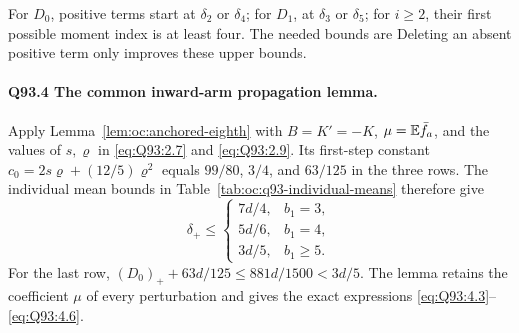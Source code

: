 For \(D_0\), positive terms start at \(\delta_2\) or \(\delta_4\);
for \(D_1\), at \(\delta_3\) or \(\delta_5\); for \(i\ge2\), their
first possible moment index is at least four. The needed bounds are
Deleting an absent positive term only improves these upper bounds.

\paragraph{Q93.4 The common inward-arm propagation lemma.}
Apply Lemma~\ref{lem:oc:anchored-eighth} with $B=K'=-K$,
$\mu=\mathbb E\bar f_a$, and the values of $s,\varrho$ in
\eqref{eq:Q93:2.7} and \eqref{eq:Q93:2.9}. Its first-step constant
$c_0=2s\varrho+(12/5)\varrho^2$ equals $99/80$, $3/4$, and
$63/125$ in the three rows. The individual mean bounds in
Table~\ref{tab:oc:q93-individual-means} therefore give
\begin{equation}\tag{Q93.4.2}\label{eq:Q93:4.2}
 \delta_+\le
 \begin{cases}7d/4,&b_1=3,\\5d/6,&b_1=4,\\3d/5,&b_1\ge5.
 \end{cases}
\end{equation}
For the last row, $(D_0)_++63d/125\le881d/1500<3d/5$.
The lemma retains the coefficient $\mu$ of every perturbation
and gives the exact expressions \eqref{eq:Q93:4.3}--\eqref{eq:Q93:4.6}.


